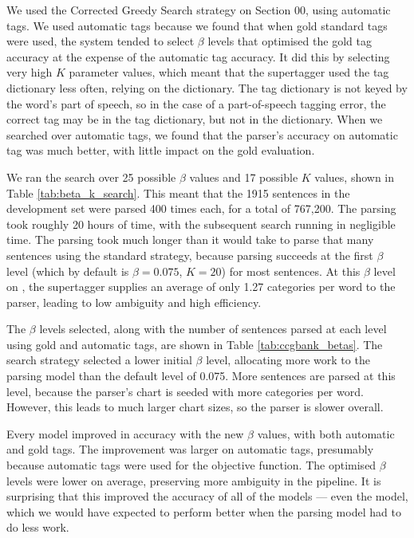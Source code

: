 We used the Corrected Greedy Search strategy on Section 00, using automatic \pos
tags.
We used automatic \pos tags because we found that when gold standard \pos tags
were used, the system tended to select $\beta$ levels that optimised the gold
\pos tag accuracy at the expense of the automatic \pos tag accuracy. It did this
by selecting very high $K$ parameter values, which meant that the supertagger
used the tag dictionary less often, relying on the \pos dictionary. The tag
dictionary is not keyed by the word's part of speech, so in the case of a
part-of-speech tagging error, the correct tag may be in the tag dictionary, but
not in the \pos dictionary. When we searched over automatic \pos tags, we found
that the parser's accuracy on automatic \pos tag was much better, with little
impact on the gold \pos evaluation.

We ran the search over 25 possible $\beta$ values and 17 possible $K$ values,
shown in Table \ref{tab:beta_k_search}. This meant that the 1915 sentences in
the development set were parsed 400 times each, for a total of 767,200. The
parsing took roughly 20 hours of \cpu time, with the subsequent search running
in negligible time. The parsing took much longer than it would take to parse
that many sentences using the standard strategy, because parsing succeeds at the
first $\beta$ level (which by default is $\beta=0.075$, $K=20$) for most
sentences. At this $\beta$ level on \ccgbank, the supertagger supplies an
average of only 1.27 categories per word to the parser, leading to low ambiguity
and high efficiency.

The $\beta$ levels selected, along with the number of sentences parsed at each
level using gold and automatic tags, are shown in Table \ref{tab:ccgbank_betas}.
The search strategy selected a lower initial $\beta$ level, allocating more work
to the parsing model than the default level of 0.075. More sentences are parsed
at this level, because the parser's chart is seeded with more categories per
word. However, this leads to much larger chart sizes, so the parser is slower
overall.

Every model improved in accuracy with the new $\beta$ values, with both
automatic and gold \pos tags. The improvement was larger on automatic \pos tags,
presumably because automatic \pos tags were used for the objective function. The
optimised $\beta$ levels were lower on average, preserving more ambiguity in the
pipeline. It is surprising that this improved the accuracy of all of the models
--- even the \derivsbad model, which we would have expected to perform better
when the parsing model had to do less work.

